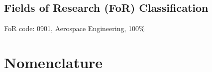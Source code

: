 \subsection*{Fields of Research (FoR) Classification}

  FoR code: 0901, Aerospace Engineering, 100\%

\tableofcontents

\listoffigures
{}
\listoftables
{}

\newpage
\section*{Nomenclature}



